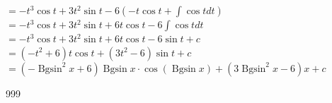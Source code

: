 \documentclass[a4paper]{article}
\newcommand{\integral}{\displaystyle\int}
\newcommand{\Bgsin}{\operatorname{Bgsin}}
\begin{document}
$= -t^3\cos t + 3t^2\sin t - 6\left(-t\cos t + \integral \cos tdt\right)$ \\

$= -t^3\cos t + 3t^2\sin t + 6t\cos t - 6\integral \cos tdt$ \\

$= -t^3\cos t + 3t^2\sin t + 6t\cos t - 6\sin t + c$ \\

$= (-t^2 + 6)t\cos t + (3t^2 - 6)\sin t + c$ \\

$= (-\Bgsin^2x + 6)\Bgsin x\cdot\cos(\Bgsin x) + (3\Bgsin^2x - 6)x + c$ \\



\begin{thebibliography}{999}
\end{thebibliography}
\end{document}
